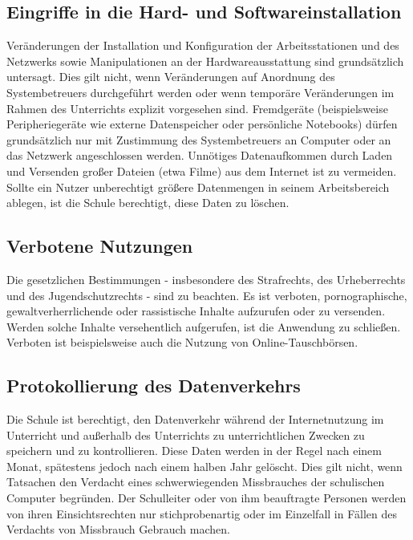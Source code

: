 \documentclass[a4paper, parskip]{scrartcl}
\begin{document}
\subsection{Eingriffe in die Hard- und Softwareinstallation}
Veränderungen der Installation und Konfiguration der Arbeitsstationen und des
Netzwerks sowie Manipulationen an der Hardwareausstattung sind grundsätzlich
untersagt. Dies gilt nicht, wenn Veränderungen auf Anordnung des
Systembetreuers durchgeführt werden oder wenn temporäre Veränderungen im Rahmen
des Unterrichts explizit vorgesehen sind. Fremdgeräte (beispielsweise
Peripheriegeräte wie externe Datenspeicher oder persönliche Notebooks) dürfen
grundsätzlich nur mit Zustimmung des Systembetreuers an Computer oder an das
Netzwerk angeschlossen werden. Unnötiges Datenaufkommen durch Laden und
Versenden großer Dateien (etwa Filme) aus dem Internet ist zu vermeiden. Sollte
ein Nutzer unberechtigt größere Datenmengen in seinem Arbeitsbereich ablegen,
ist die Schule berechtigt, diese Daten zu löschen.
\subsection{Verbotene Nutzungen}
Die gesetzlichen Bestimmungen - insbesondere des Strafrechts, des Urheberrechts
und des Jugendschutzrechts - sind zu beachten. Es ist verboten,
pornographische, gewaltverherrlichende oder rassistische Inhalte aufzurufen
oder zu versenden. Werden solche Inhalte versehentlich aufgerufen, ist die
Anwendung zu schließen. Verboten ist beispielsweise auch die Nutzung von
Online-Tauschbörsen.
\subsection{Protokollierung des Datenverkehrs}
Die Schule ist berechtigt, den Datenverkehr während der Internetnutzung im
Unterricht und außerhalb des Unterrichts zu unterrichtlichen Zwecken zu
speichern und zu kontrollieren. Diese Daten werden in der Regel nach einem
Monat, spätestens jedoch nach einem halben Jahr gelöscht. Dies gilt nicht,
wenn Tatsachen den Verdacht eines schwerwiegenden Missbrauches der schulischen
Computer begründen. Der Schulleiter oder von ihm beauftragte Personen werden
von ihren Einsichtsrechten nur stichprobenartig oder im Einzelfall in Fällen
des Verdachts von Missbrauch Gebrauch machen.
\end{document}
